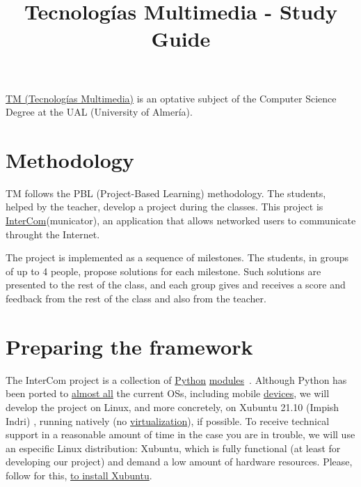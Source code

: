 \title{Tecnologías Multimedia - Study Guide}

\maketitle

\href{https://www.ual.es/estudios/grados/presentacion/plandeestudios/asignatura/4015/40154321}{TM
  (Tecnologías Multimedia)} is an optative subject of the Computer
Science Degree at the UAL (University of Almería).

\section{Methodology}
TM follows the PBL (Project-Based Learning) methodology. The students,
helped by the teacher, develop a project during the classes. This
project
is \href{https://github.com/Tecnologias-multimedia/intercom}{InterCom}(municator),
an application that allows networked users to communicate throught
the Internet.

The project is implemented as a sequence of milestones. The students,
in groups of up to 4 people, propose solutions for each
milestone. Such solutions are presented to the rest of the class, and
each group gives and receives a score and feedback from the rest of
the class and also from the teacher.

\section{Preparing the framework}

The InterCom project \cite{intercom} is a collection of
\href{https://www.python.org/}{Python}
\href{https://docs.python.org/3/tutorial/modules.html#modules}{modules}~\cite{python}.
Although Python has been ported to
\href{https://www.python.org/download/other/}{almost all} the current
OSs, including mobile \href{https://kivy.org/#home}{devices}, we will
develop the project on Linux, and more concretely, on Xubuntu 21.10
(Impish Indri) \cite{xubuntu}, running natively (no
\href{https://en.wikipedia.org/wiki/Virtualization}{virtualization}),
if possible. To receive technical support in a reasonable amount of
time in the case you are in trouble, we will use an especific Linux
distribution: Xubuntu, which is fully functional (at least for
developing our project) and demand a low amount of hardware
resources. Please, follow for this,
\href{https://vicente-gonzalez-ruiz.github.io/Xubuntu_install/}{to
  install Xubuntu}.

